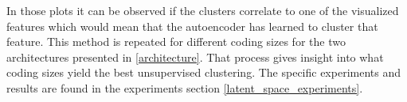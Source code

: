In those plots it can be observed if the clusters correlate to one of the visualized features which would mean that
the autoencoder has learned to cluster that feature.
This method is repeated for different coding sizes for the two architectures presented in \ref{architecture}.
That process gives insight into what coding sizes yield the best unsupervised clustering. The specific experiments
and results are found in the experiments section \ref{latent_space_experiments}.
